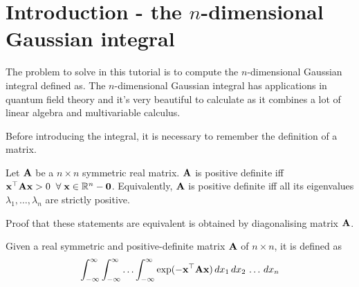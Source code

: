 \documentclass[a4paper]{article}
\begin{document}






\newpage
\tableofcontents
\newpage



\section{Introduction - the $n$-dimensional Gaussian integral}
The problem to solve in this tutorial is to compute the $n$-dimensional Gaussian integral defined as. The $n$-dimensional Gaussian integral has applications in quantum field theory  and it's very beautiful to calculate as it combines a lot of linear algebra and multivariable calculus.

Before introducing the integral, it is necessary to remember the definition of a  matrix.
\begin{definition}
	Let $\textbf{A}$ be a $n\times n$ symmetric real matrix. $\textbf{A}$ is positive definite iff $\textbf{x}^{\top}\textbf{A}\textbf{x}>0 \;\; \forall \; \textbf{x}\in\mathbb{R}^n - {\textbf{0}}$. Equivalently, $\textbf{A}$ is positive definite iff all its eigenvalues $\lambda_1,\ldots,\lambda_n$ are strictly positive.
\end{definition}
Proof that these statements are equivalent is obtained by diagonalising matrix $\textbf{A}$.

\begin{definition}
Given a real symmetric and positive-definite matrix $\textbf{A}$ of $n\times n$, it is defined as
\begin{equation}
	\int_{-\infty}^\infty \int_{-\infty}^\infty \ldots \int_{-\infty}^\infty \exp(-\textbf{x}^{\top} \textbf{A} \textbf{x}) \,dx_1\,dx_2\,\ldots\, dx_n
\end{equation}
\end{definition}
\end{document}
